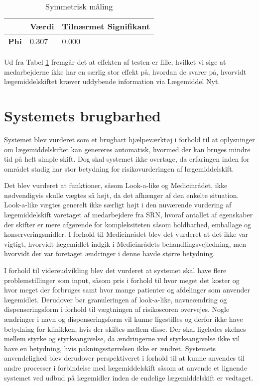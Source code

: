\begin{table}[H]
\caption{Symmetrisk måling}
\vspace{2mm}
\label{table:test3}
\centering
\begin{tabular}{p{2cm}|p{2cm}|p{4.5cm}}
\cellcolor[HTML]{C0C0C0}\textbf{} & \cellcolor[HTML]{C0C0C0}\textbf{Værdi} & \cellcolor[HTML]{C0C0C0}\textbf{Tilnærmet Signifikant} \\ \hline
\cellcolor[HTML]{C0C0C0}\textbf{Phi} & 0.307 & 0.000 \\
\end{tabular}
\end{table}

Ud fra Tabel \ref{table:test3} fremgår det at effekten af testen er lille, hvilket vi sige at medarbejderne ikke har en særlig stor effekt på, hvordan de svarer på, hvorvidt lægemiddelskiftet kræver uddybende information via Lægemiddel Nyt.

\section{Systemets brugbarhed}
Systemet blev vurderet som et brugbart hjælpeværktøj i forhold til at oplysninger om lægemiddelskiftet kan genereres automatisk, hvormed der kan bruges mindre tid på helt simple skift. Dog skal systemet ikke overtage, da erfaringen inden for området stadig har stor betydning for risikovurderingen af lægemiddelskift. 

Det blev vurderet at funktioner, såsom Look-a-like og Medicinrådet, ikke nødvendigvis skulle vægtes så højt, da det afhænger af den enkelte situation. Look-a-like vægtes generelt ikke særligt højt i den nuværende vurdering af lægemiddelskift varetaget af medarbejdere fra SRN, hvoraf antallet af egenskaber der skifter er mere afgørende for kompleksiteten såsom holdbarhed, emballage og konserveringsmidler. I forhold til Medicinrådet blev det vurderet at det ikke var vigtigt, hvorvidt lægemidlet indgik i Medicinrådets behandlingsvejledning, men hvorvidt der var foretaget ændringer i denne havde større betydning. 

I forhold til videreudvikling blev det vurderet at systemet skal have flere problemstillinger som input, såsom pris i forhold til hvor meget det koster og hvor meget der forbruges samt hvor mange patienter og afdelinger som anvender lægemidlet. Derudover bør granuleringen af look-a-like, navneændring og dispenseringsform i forhold til vægtningen af risikoscoren overvejes. Nogle ændringer i navn og dispenseringsform vil kunne ligestilles og derfor ikke have betydning for klinikken, hvis der skiftes mellem disse. Der skal ligeledes skelnes mellem styrke og styrkeangivelse, da ændringerne ved styrkeangivelse ikke vil have en betydning, hvis pakningsstørrelsen ikke er ændret. Systemets anvendelighed blev derudover perspektiveret i forhold til at kunne anvendes til andre processer i forbindelse med lægemiddelskift såsom at anvende et lignende systemet ved udbud på lægemidler inden de endelige lægemiddelskift er vedtaget. 


